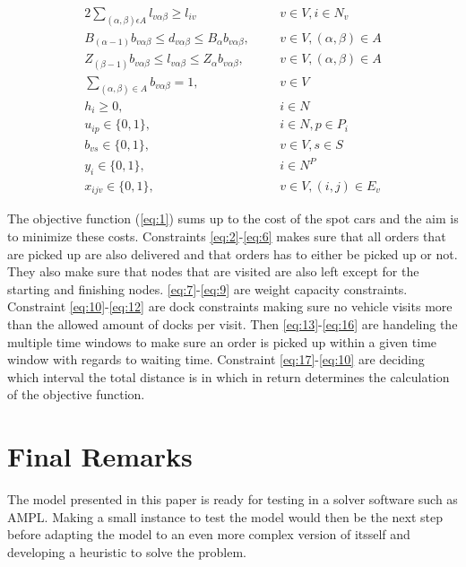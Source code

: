 \documentclass[a4paper,10pt]{article}
\begin{document}
\begin{alignat} {2}
	\sum_{(\alpha,\beta) \epsilon A} l_{v\alpha\beta} \geq l_{iv}		&	&& 	v \in V, i \in N_v				\label{eq:18}	\\[4pt]
	B_{(\alpha-1)}b_{v\alpha\beta} \leq d_{v\alpha\beta} \leq 
	B_\alpha b_{v\alpha\beta},						& 	&&	v \in V, (\alpha, \beta) \in A			\label{eq:19}	\\[8pt]
 	Z_{(\beta-1)}b_{v\alpha\beta} \leq l_{v\alpha\beta} \leq 
	Z_\alpha b_{v\alpha\beta},						& 	&&	v \in V, (\alpha, \beta) \in A 			\label{eq:20}	\\[8pt]   	
	\sum_{(\alpha, \beta) \in A} b_{v\alpha\beta} = 1,			& 	&&	v \in V						\label{eq:21}	\\[4pt]
    	h_{i} \geq 0,								& 	&&	i \in N 					\label{eq:22}	\\[8pt]
    	u_{ip} \in \{0, 1\},							& 	&&	i \in N, p \in P_i 				\label{eq:23}	\\[8pt]
    	b_{vs} \in \{0, 1\},							& 	&&	v \in V, s \in S 				\label{eq:24}	\\[8pt]
    	y_i \in \{0, 1\},							& 	&&	i \in N^P 					\label{eq:25}	\\[8pt]
    	x_{ijv} \in \{0, 1\},							&	&&	v \in V, (i, j) \in E_v 			\label{eq:26}
\end{alignat} 
\endgroup

\par
The objective function (\ref{eq:1}) sums up to the cost of the spot cars and the aim is to minimize these costs. 
Constraints \ref{eq:2}-\ref{eq:6} makes sure that all orders that are picked up are also delivered and that orders has to either be picked up or not. They also make sure that nodes that are visited are also left except for the starting and finishing nodes.
\ref{eq:7}-\ref{eq:9} are weight capacity constraints.
Constraint \ref{eq:10}-\ref{eq:12} are dock constraints making sure no vehicle visits more than the allowed amount of docks per visit.
Then \ref{eq:13}-\ref{eq:16} are handeling the multiple time windows to make sure an order is picked up within a given time window with regards to waiting time.
Constraint \ref{eq:17}-\ref{eq:10} are deciding which interval the total distance is in which in return determines the calculation of the objective function. \newline

\section{Final Remarks}
The model presented in this paper is ready for testing in a solver software such as AMPL. Making a small instance to test the model would then be the next step before adapting the model to an even more complex version of itsself and developing a heuristic to solve the problem. 




\end{document}
